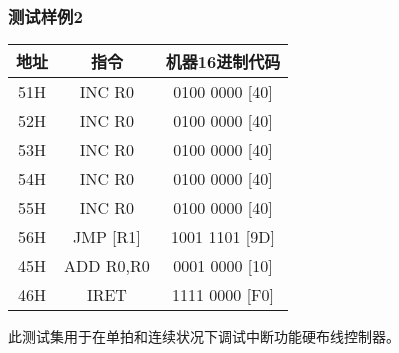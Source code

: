 \subsubsection{测试样例2}
\begin{table}[htbp]
    \centering
    \begin{tabular}[c]{|c|c|c|}
        \hline
        地址  & 指令        & 机器16进制代码      \\
        \hline
        51H & INC R0    & 0100 0000 [40] \\
        \hline
        52H & INC R0    & 0100 0000 [40] \\
        \hline
        53H & INC R0    & 0100 0000 [40] \\
        \hline
        54H & INC R0    & 0100 0000 [40] \\
        \hline
        55H & INC R0    & 0100 0000 [40] \\
        \hline
        56H & JMP [R1]   & 1001 1101 [9D] \\
        \hline
        45H & ADD R0,R0 & 0001 0000 [10] \\
        \hline
        46H & IRET      & 1111 0000 [F0]  \\
        \hline
    \end{tabular}
\end{table}

此测试集用于在单拍和连续状况下调试中断功能硬布线控制器。